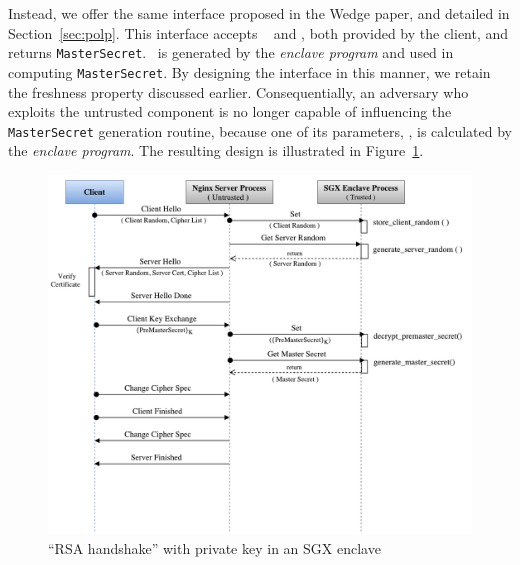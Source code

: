 \documentclass[../../main.tex]{subfiles}
\begin{document}
Instead, we offer the same interface proposed in the Wedge paper, and
detailed in Section~\ref{sec:polp}. This interface accepts \crandom~
and \premaster, both provided by the client, and returns
\texttt{MasterSecret}. \srandom~is generated by the \textit{enclave
  program} and used in computing \texttt{MasterSecret}. By designing
the interface in this manner, we retain the freshness property
discussed earlier. Consequentially, an adversary who exploits the
untrusted component is no longer capable of influencing the
\texttt{MasterSecret} generation routine, because one of its
parameters, \srandom, is calculated by the \textit{enclave program}.
The resulting design is illustrated in Figure~\ref{fig:rsa-enc}.

\begin{figure}[H]
  \centering
  \includegraphics[scale=0.35]{images/RSA-SGX-Handshake.pdf}
  \caption[``RSA handshake'' and enclave]{``RSA handshake'' with
    private key in an SGX enclave}
  \label{fig:rsa-enc}
\end{figure}
\end{document}
